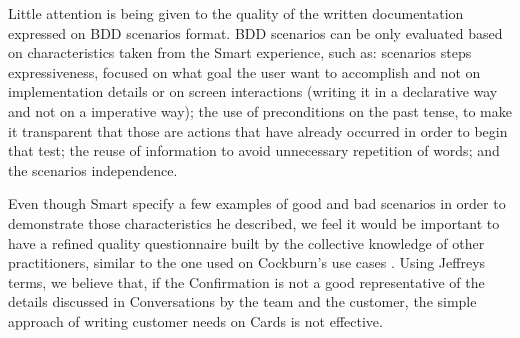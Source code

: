 Little attention is being given to the quality of the written documentation expressed on BDD scenarios format. BDD scenarios can be only evaluated based on characteristics taken from the Smart \cite{Smart_2014} experience, such as: scenarios steps expressiveness, focused on what goal the user want to accomplish and not on implementation details or on screen interactions (writing it in a declarative way and not on a imperative way); the use of preconditions on the past tense, to make it transparent that those are actions that have already occurred in order to begin that test; the reuse of information to avoid unnecessary repetition of words; and the scenarios independence. 

Even though Smart \cite{Smart_2014} specify a few examples of good and bad scenarios in order to demonstrate those characteristics he described, we feel it would be important to have a refined quality questionnaire built by the collective knowledge of other practitioners, similar to the one used on Cockburn's use cases \cite{Cockburn_2000}. Using Jeffreys \cite{Jeffries_2001} terms, we believe that, if the Confirmation is not a good representative of the details discussed in Conversations by the team and the customer, the simple approach of writing customer needs on Cards is not effective. 